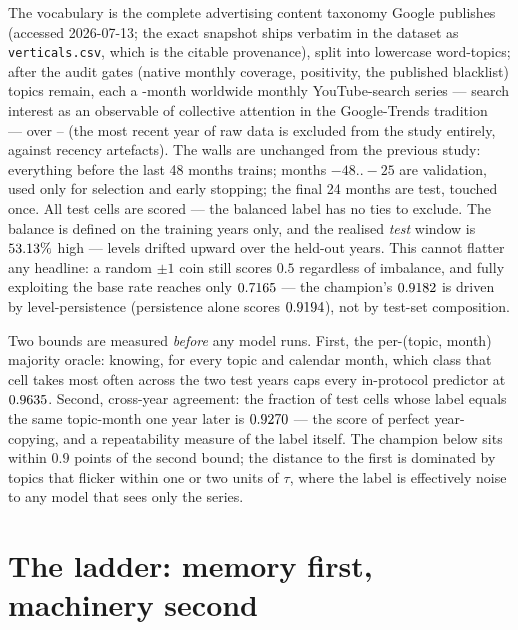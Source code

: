 \documentclass[11pt]{artaquest}
\begin{document}
The vocabulary is the complete advertising content taxonomy Google publishes~\cite{googleads2024verticals} (accessed 2026-07-13; the exact snapshot ships verbatim in the dataset as \texttt{verticals.csv}, which is the citable provenance), split into
lowercase word-topics; after the audit gates (native monthly coverage, positivity, the
published blacklist) \nTopics{} topics remain, each a \nMonths{}-month worldwide monthly
YouTube-search series --- search interest as an observable of collective attention in the
Google-Trends tradition~\cite{choi2012predicting} --- over \winStart{}--\winEnd{} (the most recent year of raw data is excluded
from the study entirely, against recency artefacts). The walls are unchanged from the previous
study: everything before the last 48 months trains; months $-48..-25$ are validation, used only
for selection and early stopping; the final 24 months are test, touched once. All \nCells{}
test cells are scored --- the balanced label has no ties to exclude. The balance is defined on
the training years only, and the realised \emph{test} window is $53.13\%$ high ---
levels drifted upward over the held-out years. This cannot flatter any headline: a random $\pm1$
coin still scores $0.5$ regardless of imbalance, and fully exploiting the base rate reaches
only $0.7165$ --- the champion's $0.9182$ is driven by level-persistence
(persistence alone scores $0.9194$), not by test-set composition.

Two bounds are measured \emph{before} any model runs. First, the per-(topic, month) majority
oracle: knowing, for every topic and calendar month, which class that cell takes most often
across the two test years caps every in-protocol predictor at $0.9635$. Second, cross-year
agreement: the fraction of test cells whose label equals the same topic-month one year later is
$0.9270$ --- the score of perfect year-copying, and a repeatability measure of the label
itself. The champion below sits within $0.9$ points of the second bound; the distance to the
first is dominated by topics that flicker within one or two units of $\tau$, where the label
is effectively noise to any model that sees only the series.

\section{The ladder: memory first, machinery second}
\end{document}
